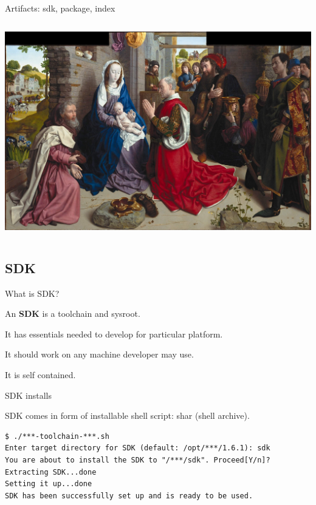 \documentclass{beamer}
\begin{document}
\begin{frame}{Artifacts: sdk, package, index}
    \begin{columns}
        \centering
        \includegraphics[width=\linewidth]{Hugo_van_der_Goes_-_The_Adoration_of_the_Kings.jpg}
    \end{columns}
\end{frame}

\subsection{SDK}

\begin{frame}{What is SDK?}
    \begin{block}{}
        An \textbf{SDK} is a toolchain and sysroot.
    \end{block}
    \begin{block}{}
        It has essentials needed to develop for particular platform.
    \end{block}
    \begin{block}{}
        It should work on any machine developer may use.
    \end{block}
    \begin{block}{}
        It is self contained.
    \end{block}
\end{frame}

\begin{frame}[fragile]{SDK installs}
\begin{block}{}
SDK comes in form of installable shell script: shar
(shell archive).
\end{block}
\begin{lstlisting}[style=Console]
$ ./***-toolchain-***.sh
Enter target directory for SDK (default: /opt/***/1.6.1): sdk
You are about to install the SDK to "/***/sdk". Proceed[Y/n]?
Extracting SDK...done
Setting it up...done
SDK has been successfully set up and is ready to be used.
\end{lstlisting}
\end{frame}
\end{document}
